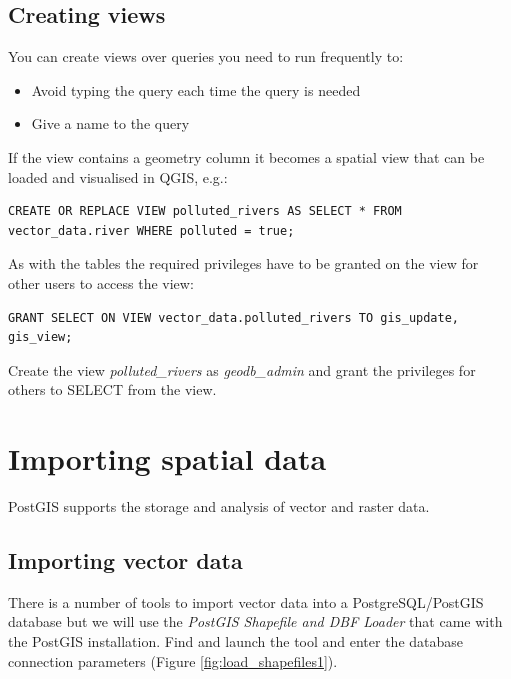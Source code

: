 \documentclass[a4paper,12pt,titlepage]{article}
\begin{document}
\subsection{Creating views}

You can create views over queries you need to run frequently to:

\begin{itemize}
	\item Avoid typing the query each time the query is needed
	\item Give a name to the query
\end{itemize}

If the view contains a geometry column it becomes a spatial view that can be loaded and visualised in QGIS, e.g.:

\begin{lstlisting}[caption={Creating a view}]
CREATE OR REPLACE VIEW polluted_rivers AS SELECT * FROM vector_data.river WHERE polluted = true;
\end{lstlisting}

As with the tables the required privileges have to be granted on the view for other users to access the view:

\begin{lstlisting}[caption={Granting privileges on spatial view}]
GRANT SELECT ON VIEW vector_data.polluted_rivers TO gis_update, gis_view;
\end{lstlisting}

Create the view \textit{polluted\_rivers} as \textit{geodb\_admin} and grant the privileges for others to SELECT from the view.

\section{Importing spatial data}

PostGIS supports the storage and analysis of vector and raster data.

\subsection{Importing vector data}

There is a number of tools to import vector data into a PostgreSQL/PostGIS database but we will use the \textit{PostGIS Shapefile and DBF Loader} that came with the PostGIS installation. Find and launch the tool and enter the database connection parameters (Figure \ref{fig:load_shapefiles1}).
\end{document}

